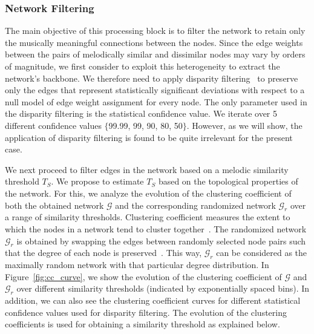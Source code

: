 \subsubsection{Network Filtering}
\label{sec:network_filtering}

The main objective of this processing block is to filter the network to retain only the musically meaningful connections between the nodes. Since the edge weights between the pairs of melodically similar and dissimilar nodes may vary by orders of magnitude, we first consider to exploit this heterogeneity to extract the network's backbone. We therefore need to apply disparity filtering~\cite{Serrano09PNAS} to preserve only the edges that represent statistically significant deviations with respect to a null model of edge weight assignment for every node. The only parameter used in the disparity filtering is the statistical confidence value. We iterate over 5 different confidence values $\lbrace$99.99, 99, 90, 80, 50$\rbrace$. However, as we will show, the application of disparity filtering is found to be quite irrelevant for the present case.



We next proceed to filter edges in the network based on a melodic similarity threshold $T_S$. We propose to estimate $T_S$ based on the topological properties of the network. For this, we analyze the evolution of the clustering coefficient of both the obtained network $\mathcal{G}$ and the corresponding randomized network $\mathcal{G}_r$ over a range of similarity thresholds. Clustering coefficient measures the extent to which the nodes in a network tend to cluster together~\cite{newman2003structure}. The randomized network $\mathcal{G}_r$ is obtained by swapping the edges between randomly selected node pairs such that the degree of each node is preserved~\cite{maslov2002specificity}. This way, $\mathcal{G}_r$ can be considered as the maximally random network with that particular degree distribution. In Figure~\ref{fig:cc_curve}, we show the evolution of the clustering coefficient of $\mathcal{G}$ and $\mathcal{G}_r$ over different similarity thresholds (indicated by exponentially spaced bins). In addition, we can also see the clustering coefficient curves for different statistical confidence values used for disparity filtering. The evolution of the clustering coefficients is used for obtaining a similarity threshold as explained below.

